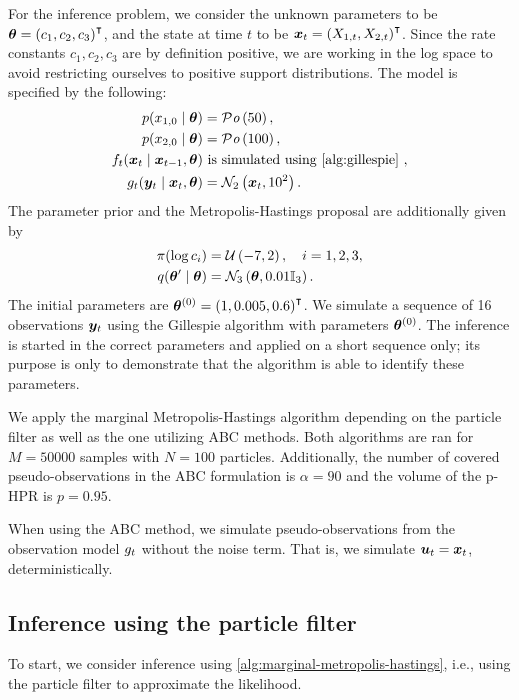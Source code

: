 For the inference problem, we consider the unknown parameters to be $\bm{\theta} = \left(c_1, c_2, c_3\right)^\intercal$, and the state at time $t$ to be $\bm{x}_t = \left(X_{1,t}, X_{2,t}\right)^\intercal$. Since the rate constants $c_1, c_2, c_3$ are by definition positive, we are working in the log space to avoid restricting ourselves to positive support distributions. The model is specified by the following:
\begin{equation*}
\begin{split}
\sprior(x_{1,0} \mid \btheta) &= \mathcal{P}\mathit{o}\left(50\right), \\
\sprior(x_{2,0} \mid \btheta) &= \mathcal{P}\mathit{o}\left(100\right), \\
\trans_t(\bx_t \mid \bx_{t-1}, \btheta) & \text{ is simulated using \autoref{alg:gillespie} }, \\
\obs_t(\by_t \mid \bx_{t}, \btheta) &= \mathcal{N}_2\left(\bx_t, 10^2\right).
\end{split}
\end{equation*}
The parameter prior and the Metropolis-Hastings proposal are additionally given by
\begin{equation*}
\begin{split}
\pi(\log c_i) &= \mathcal{U}\left(-7, 2\right), \quad i = 1, 2, 3, \\
q(\bm{\theta}^\prime \mid \bm{\theta}) &= \mathcal{N}_3\left(\bm{\theta}, 0.01 \mathbb{I}_3\right).
\end{split}
\end{equation*}
The initial parameters are $\bm{\theta}^{(0)} = \left(1, 0.005, 0.6\right)^\intercal$. We simulate a sequence of 16 observations $\bm{y}_t$ using the Gillespie algorithm with parameters $\bm{\theta}^{(0)}$. The inference is started in the correct parameters and applied on a short sequence only; its purpose is only to demonstrate that the algorithm is able to identify these parameters.

We apply the marginal Metropolis-Hastings algorithm depending on the particle filter as well as the one utilizing ABC methods. Both algorithms are ran for $M = 50000$ samples with $N = 100$ particles. Additionally, the number of covered pseudo-observations in the ABC formulation is $\alpha = 90$ and the volume of the p-HPR is $p = 0.95$.

When using the ABC method, we simulate pseudo-observations from the observation model $g_t$ without the noise term. That is, we simulate $\bm{u}_t = \bm{x}_t$, deterministically.

\subsection{Inference using the particle filter}
To start, we consider inference using \autoref{alg:marginal-metropolis-hastings}, i.e., using the particle filter to approximate the likelihood.

